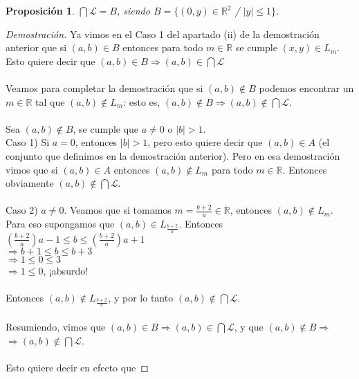 \documentclass{article}
\newtheorem*{proposicion}{Proposición}
\begin{document}
\begin{proposicion}
$\bigcap\mathscr{L} = B$, siendo $B = \{(0,y) \in  \mathbb{R}^2$ / $ |y| \le 1 \}$.
\end{proposicion}

\begin{proof}[Demostración]
Ya vimos en el Caso 1 del apartado (ii) de la demostración anterior que si $(a,b) \in B$ entonces para todo $m \in \mathbb{R}$ se cumple $(x,y) \in L_m$. Esto quiere decir que $(a,b) \in B \Rightarrow (a,b) \in \bigcap\mathscr{L}$ \\ \\ Veamos para completar la demostración que si $(a,b) \notin B$ podemos encontrar un $m \in \mathbb{R}$ tal que $(a,b) \notin L_m$: esto es, $(a,b) \notin B \Rightarrow (a,b) \notin \bigcap\mathscr{L}$. \\ \\
Sea $(a,b) \notin B$, se cumple que $a \ne 0$ o $|b| > 1$. \\
Caso 1) Si $a = 0$, entonces $|b| > 1$, pero esto quiere decir que $(a,b) \in A$ (el conjunto que definimos en la demostración anterior). Pero en esa demostración vimos que si $(a,b) \in A$ entonces $(a,b) \notin L_m$ para todo $m \in \mathbb{R}$. Entonces obviamente $(a,b) \notin \bigcap\mathscr{L}$. \\\\
Caso 2) $a \ne 0$. Veamos que si tomamos $m = \frac{b+2}{a} \in \mathbb{R}$, entonces $(a,b) \notin L_m$. Para eso supongamos que $(a,b) \in L_\frac{b+2}{a}$. Entonces \\ $(\frac{b+2}{a})a - 1 \le b \le (\frac{b+2}{a})a + 1$ \\ $\Rightarrow b + 1 \le b \le b+3$ \\ $\Rightarrow 1 \le 0 \le 3$ \\ $\Rightarrow 1 \le 0$, ¡absurdo! \\\\
Entonces $(a,b) \notin L_\frac{b+2}{a}$, y por lo tanto $(a,b) \notin \bigcap\mathscr{L}$. \\ \\
Resumiendo, vimos que $(a,b) \in B \Rightarrow (a,b) \in \bigcap\mathscr{L}$, y que $(a,b) \notin B \Rightarrow$ $\Rightarrow (a,b) \notin \bigcap\mathscr{L}$. \\ \\ Esto quiere decir en efecto que 
\end{proof}
\end{document}
